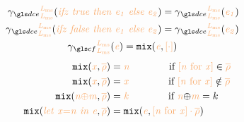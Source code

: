 \documentclass[acmsmall]{acmart}
\theoremstyle{definition}
\begin{document}
\vspace{-1em}
\begin{gather*}
  \begin{align*}
    \ccdce(\irl{\lifz{true}{\expr[_{1}]}{\expr[_{2}]}}) & = \ccdce(\irl{\expr[_{1}]}) &\\
    \ccdce(\irl{\lifz{false}{\expr[_{1}]}{\expr[_{2}]}}) & = \ccdce(\irl{\expr[_{2}]}) &
  \end{align*}
  \\
  \begin{align*}
    \cccf(\irl{\expr}) & = \partialeval{\irl{\expr}}{\irl{\hole{\cdot}}} &
  \end{align*}
  \\[0.125cm]
  \begin{align*}
   \partialeval{\irl{x}}{\irl{\substlist}} & = \irl{n} 
   	\qquad\qquad \text{if } \irl{\subst{n}{x}}\in\irl{\substlist} \\
   \partialeval{\irl{x}}{\irl{\substlist}} & = \irl{x} 
   \qquad\qquad \text{if } \irl{\subst{n}{x}}\notin\irl{\substlist} \\
   \partialeval{\irl{\lbinop{n}{m}}}{\irl{\substlist}} & = \irl{k} 
   \qquad\qquad \text{if } \lbinop{\irl{n}}{\irl{m}}=k \\
   \partialeval{\irl{\llet{x}{n}{\expr}}}{\irl{\substlist}} & = \partialeval{\irl{\expr}}{\irl{\subst{n}{x}\cdot\substlist}} 
\end{align*}
\end{gather*}
\end{document}
